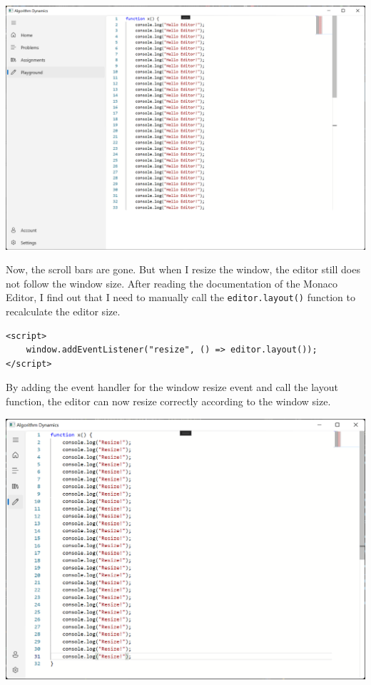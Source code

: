 \documentclass[a4paper]{report}
\newcommand{\code}{\texttt}
\begin{document}
\includegraphics[width=\textwidth, height=\textheight, keepaspectratio]{PlaygroundPage-WebView2-ResizeFailed}

Now, the scroll bars are gone. But when I resize the window, the editor still does not follow the window size. After reading the documentation of the Monaco Editor, I find out that I need to manually call the \code{editor.layout()} function to recalculate the editor size.

\begin{verbatim}
<script>
    window.addEventListener("resize", () => editor.layout());
</script>
\end{verbatim}

By adding the event handler for the window resize event and call the layout function, the editor can now resize correctly according to the window size.

\includegraphics[width=\textwidth, height=\textheight, keepaspectratio]{PlaygroundPage-WebView2-ResizeSuccess}
\end{document}
